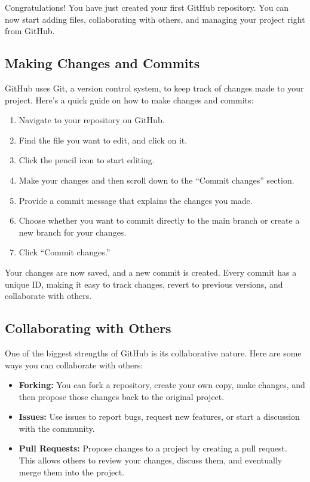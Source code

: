 \documentclass[a4paper,12pt]{book}
\begin{document}
Congratulations! You have just created your first GitHub repository. You can now start adding files, collaborating with others, and managing your project right from GitHub.

\subsection*{Making Changes and Commits}

GitHub uses Git, a version control system, to keep track of changes made to your project. Here’s a quick guide on how to make changes and commits:

\begin{enumerate}
    \item Navigate to your repository on GitHub.
    \item Find the file you want to edit, and click on it.
    \item Click the pencil icon to start editing.
    \item Make your changes and then scroll down to the “Commit changes” section.
    \item Provide a commit message that explains the changes you made.
    \item Choose whether you want to commit directly to the main branch or create a new branch for your changes.
    \item Click “Commit changes.”
\end{enumerate}

Your changes are now saved, and a new commit is created. Every commit has a unique ID, making it easy to track changes, revert to previous versions, and collaborate with others.

\subsection*{Collaborating with Others}

One of the biggest strengths of GitHub is its collaborative nature. Here are some ways you can collaborate with others:

\begin{itemize}
    \item \textbf{Forking:} You can fork a repository, create your own copy, make changes, and then propose those changes back to the original project.
    \item \textbf{Issues:} Use issues to report bugs, request new features, or start a discussion with the community.
    \item \textbf{Pull Requests:} Propose changes to a project by creating a pull request. This allows others to review your changes, discuss them, and eventually merge them into the project.
\end{itemize}
\end{document}
